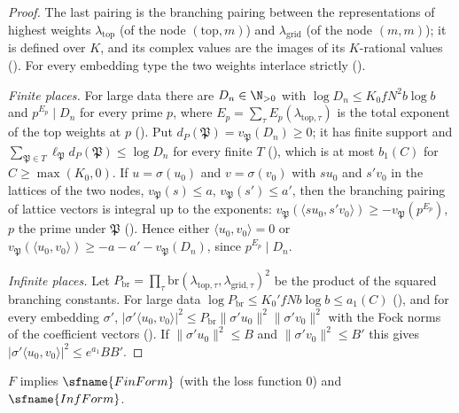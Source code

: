 \begin{proof}
The last pairing is the branching pairing between the representations of highest weights $\lambda_{\mathrm{top}}$ (of the node
$(\mathrm{top},m)$) and $\lambda_{\mathrm{grid}}$ (of the node $(m,m)$); it is defined over $K$, and its complex values are the
images of its $K$-rational values (). For every embedding type the two
weights interlace strictly ().

\emph{Finite places.} For large data there are $D_n\in\N_{>0}$ with $\log D_n\le K_0fN^2b\log b$ and $p^{E_p}\mid D_n$ for every
prime $p$, where $E_p=\sum_\tau E_p(\lambda_{\mathrm{top},\tau})$ is the total exponent of the top weights at $p$
(). Put $d_P(\mathfrak P)=v_{\mathfrak P}(D_n)\ge0$; it has finite
support and $\sum_{\mathfrak P\in T}\ell_{\mathfrak P}d_P(\mathfrak P)\le\log D_n$ for every finite $T$
(), which is at most $b_1(C)$ for $C\ge\max(K_0,0)$. If $u=\sigma(u_0)$
and $v=\sigma(v_0)$ with $su_0$ and $s'v_0$ in the lattices of the two nodes, $v_{\mathfrak P}(s)\le a$, $v_{\mathfrak P}(s')\le a'$,
then the branching pairing of lattice vectors is integral up to the exponents:
$v_{\mathfrak P}(\langle su_0,s'v_0\rangle)\ge-v_{\mathfrak P}(p^{E_p})$, $p$ the prime under $\mathfrak P$
(). Hence either $\langle u_0,v_0\rangle=0$ or
$v_{\mathfrak P}(\langle u_0,v_0\rangle)\ge-a-a'-v_{\mathfrak P}(D_n)$, since $p^{E_p}\mid D_n$.

\emph{Infinite places.} Let $P_{\mathrm{br}}=\prod_\tau\mathrm{br}(\lambda_{\mathrm{top},\tau},\lambda_{\mathrm{grid},\tau})^2$ be
the product of the squared branching constants. For large data $\log P_{\mathrm{br}}\le K_0'fNb\log b\le a_1(C)$
(), and for every embedding $\sigma'$,
$|\sigma'\langle u_0,v_0\rangle|^2\le P_{\mathrm{br}}\|\sigma'u_0\|^2\|\sigma'v_0\|^2$ with the Fock norms of the coefficient vectors
(). If $\|\sigma'u_0\|^2\le B$ and $\|\sigma'v_0\|^2\le B'$
this gives $|\sigma'\langle u_0,v_0\rangle|^2\le e^{a_1}BB'$.
\end{proof}

\begin{theorem}\label{pf:fit:formval}
$F$ implies $\sfname{FinForm}$ (with the loss function $0$) and $\sfname{InfForm}$.
\end{theorem}

